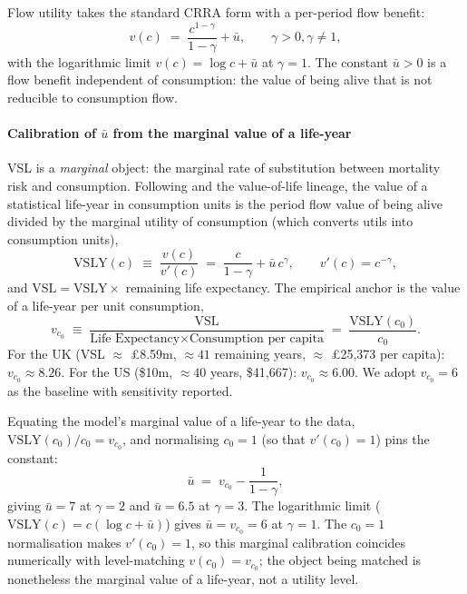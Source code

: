 \documentclass{_latex/house}
\begin{document}
Flow utility takes the standard CRRA form with a per-period flow benefit:
\begin{equation}
v(c) \;=\; \frac{c^{1-\gamma}}{1-\gamma} + \bar u, \qquad \gamma > 0, \gamma \neq 1,
\label{eq:utility}
\end{equation}
with the logarithmic limit $v(c) = \log c + \bar u$ at $\gamma = 1$. The constant $\bar u > 0$ is a flow benefit independent of consumption: the value of being alive that is not reducible to consumption flow.

\paragraph{Calibration of $\bar u$ from the marginal value of a life-year} VSL is a \emph{marginal} object: the marginal rate of substitution between mortality risk and consumption. Following \citet{hall2007value} and the \citet{murphy2006value} value-of-life lineage, the value of a statistical life-year in consumption units is the period flow value of being alive divided by the marginal utility of consumption (which converts utils into consumption units),
\begin{equation}
\text{VSLY}(c) \;\equiv\; \frac{v(c)}{v'(c)} \;=\; \frac{c}{1-\gamma} + \bar u\, c^{\gamma},
\qquad v'(c) = c^{-\gamma},
\label{eq:vsly}
\end{equation}
and $\text{VSL} = \text{VSLY}\times$ remaining life expectancy. The empirical anchor is the value of a life-year per unit consumption,
\begin{equation}
v_{c_0} \;\equiv\; \frac{\text{VSL}}{\text{Life Expectancy} \times \text{Consumption per capita}} \;=\; \frac{\text{VSLY}(c_0)}{c_0}.
\label{eq:vsl-norm}
\end{equation}
For the UK (VSL $\approx$ \pounds 8.59m, $\approx 41$ remaining years, $\approx$ \pounds 25{,}373 per capita): $v_{c_0} \approx 8.26$. For the US (\$10m, $\approx 40$ years, \$41{,}667): $v_{c_0} \approx 6.00$. We adopt $v_{c_0} = 6$ as the baseline with sensitivity reported.

Equating the model's marginal value of a life-year to the data, $\text{VSLY}(c_0)/c_0 = v_{c_0}$, and normalising $c_0 = 1$ (so that $v'(c_0)=1$) pins the constant:
\begin{equation}
\bar u \;=\; v_{c_0} - \frac{1}{1-\gamma},
\label{eq:ubar}
\end{equation}
giving $\bar u = 7$ at $\gamma = 2$ and $\bar u = 6.5$ at $\gamma = 3$. The logarithmic limit ($\text{VSLY}(c)=c(\log c+\bar u)$) gives $\bar u = v_{c_0} = 6$ at $\gamma = 1$. The $c_0=1$ normalisation makes $v'(c_0)=1$, so this marginal calibration coincides numerically with level-matching $v(c_0)=v_{c_0}$; the object being matched is nonetheless the marginal value of a life-year, not a utility level.
\end{document}
